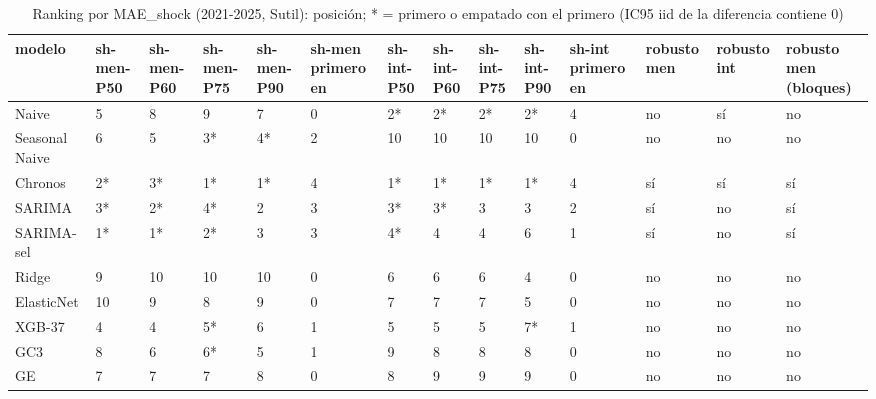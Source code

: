\begin{table}[H]
\centering
\small
\caption{Ranking por MAE\_shock (2021-2025, Sutil): posición; * = primero o empatado con el primero (IC95 iid de la diferencia contiene 0)}
\label{tab:T08_ranking_shock_principal_2021_2025_sutil}
\begin{tabular}{llllllllllllll}
\toprule
modelo & sh-men-P50 & sh-men-P60 & sh-men-P75 & sh-men-P90 & sh-men primero en & sh-int-P50 & sh-int-P60 & sh-int-P75 & sh-int-P90 & sh-int primero en & robusto men & robusto int & robusto men (bloques) \\
\midrule
Naive & 5 & 8 & 9 & 7 & 0 & 2* & 2* & 2* & 2* & 4 & no & sí & no \\
Seasonal Naive & 6 & 5 & 3* & 4* & 2 & 10 & 10 & 10 & 10 & 0 & no & no & no \\
Chronos & 2* & 3* & 1* & 1* & 4 & 1* & 1* & 1* & 1* & 4 & sí & sí & sí \\
SARIMA & 3* & 2* & 4* & 2 & 3 & 3* & 3* & 3 & 3 & 2 & sí & no & sí \\
SARIMA-sel & 1* & 1* & 2* & 3 & 3 & 4* & 4 & 4 & 6 & 1 & sí & no & sí \\
Ridge & 9 & 10 & 10 & 10 & 0 & 6 & 6 & 6 & 4 & 0 & no & no & no \\
ElasticNet & 10 & 9 & 8 & 9 & 0 & 7 & 7 & 7 & 5 & 0 & no & no & no \\
XGB-37 & 4 & 4 & 5* & 6 & 1 & 5 & 5 & 5 & 7* & 1 & no & no & no \\
GC3 & 8 & 6 & 6* & 5 & 1 & 9 & 8 & 8 & 8 & 0 & no & no & no \\
GE & 7 & 7 & 7 & 8 & 0 & 8 & 9 & 9 & 9 & 0 & no & no & no \\
\bottomrule
\end{tabular}
\end{table}